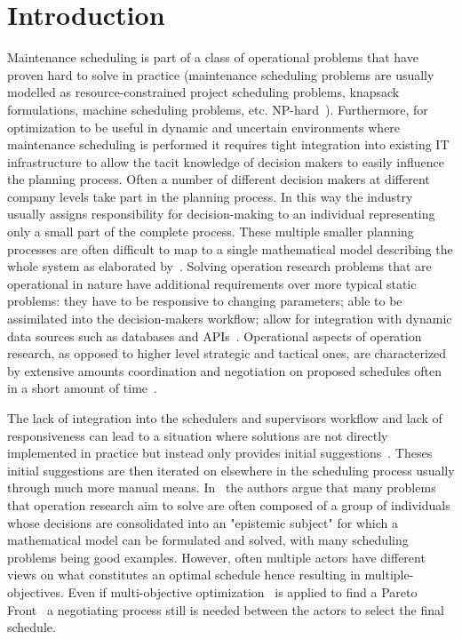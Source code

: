 \section{Introduction}
Maintenance scheduling is part of a class of operational problems that
have proven hard to solve in practice (maintenance scheduling problems are usually modelled as
resource-constrained project scheduling problems, knapsack formulations,
machine scheduling problems, etc. NP-hard~\citep{garey1979computers}).
Furthermore, for optimization to be useful in dynamic and uncertain environments
where maintenance scheduling is performed it requires tight integration into
existing IT infrastructure to allow the tacit knowledge of decision makers to
easily influence the planning process. Often a number of different decision
makers at different company levels take part in the planning process. In
this way the industry usually assigns responsibility for decision-making
to an individual representing only a small part of the complete process.
These multiple smaller planning processes are often difficult to map to
a single mathematical model describing the whole system as elaborated
by~\citep{barthelemy2002human}. Solving operation research problems that
are operational in nature have additional requirements over more typical
static problems: they have to be responsive to changing parameters; able to
be assimilated into the decision-makers workflow; allow for integration with
dynamic data sources such as databases and APIs~\citep{meignan_review_2015}.
Operational aspects of operation research, as opposed to higher level
strategic and tactical ones, are characterized by extensive amounts
coordination and negotiation on proposed schedules often in a short amount of
time~\citep{palmerMaintenancePlanningScheduling2019}.

The lack of integration into the schedulers and supervisors workflow
and lack of responsiveness can lead to a situation where solutions are
not directly implemented in practice but instead only provides initial
suggestions~\citep{meignan_review_2015}. Theses initial suggestions are then
iterated on elsewhere in the scheduling process usually through much more manual
means. In~\citep{barthelemy2002human} the authors argue that many problems that
operation research aim to solve are often composed of a group of individuals
whose decisions are consolidated into an "epistemic subject" for which a
mathematical model can be formulated and solved, with many scheduling problems
being good examples. However, often multiple actors have different views on what
constitutes an optimal schedule hence resulting in multiple-objectives. Even if
multi-objective optimization~\citep{ehrgott2002multiple} is applied to find a
Pareto Front~\citep{Pareto1897} a negotiating process still is needed between
the actors to select the final schedule.

